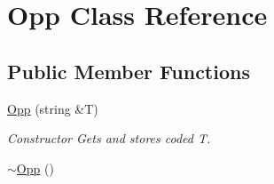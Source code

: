 \hypertarget{class_opp}{\section{\-Opp \-Class \-Reference}
\label{class_opp}
}
\subsection*{\-Public \-Member \-Functions}
\begin{DoxyCompactItemize}
\item 
\hyperlink{class_opp_a0ef321478752cb991a3774adcf78c7b2}{\-Opp} (string \&\-T)
\begin{DoxyCompactList}\small\item\em \-Constructor \-Gets and stores coded \-T. \end{DoxyCompactList}\item 
\hypertarget{class_opp_ae81125439d70890bb333140f123b244e}{\hyperlink{class_opp_ae81125439d70890bb333140f123b244e}{$\sim$\-Opp} ()}\label{class_opp_ae81125439d70890bb333140f123b244e}


\end{DoxyCompactItemize}
